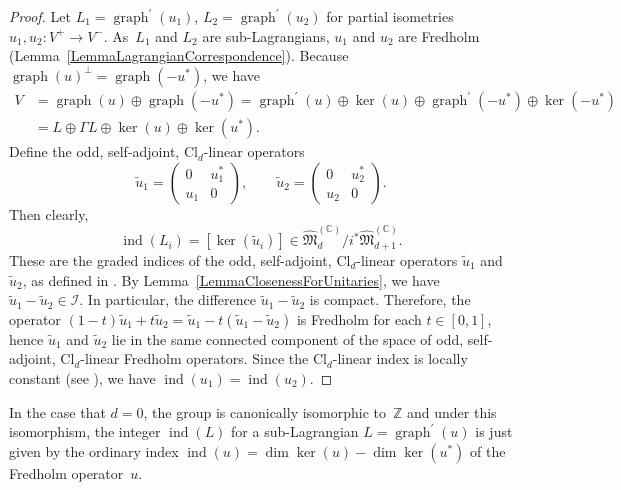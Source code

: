\documentclass[10pt,a4paper]{amsart}
\numberwithin{equation}{section}
\DeclareMathOperator{\graph}{\mathrm{graph}}
\newcommand{\Z}{\mathbb{Z}}
\newcommand{\C}{\mathbb{C}}
\newcommand{\ind}{\operatorname{ind}}
\newcommand{\Cl}{\mathrm{Cl}}
\begin{document}
\begin{proof}
 Let $L_1 = \graph^\prime(u_1)$, $L_2 = \graph^\prime(u_2)$ for partial isometries $u_1, u_2 \colon V^+ \to V^-$.
 As~$L_1$ and $L_2$ are sub-Lagrangians, ${u}_1$ and ${u}_2$ are Fredholm (Lemma~\ref{LemmaLagrangianCorrespondence}).
 Because $\graph(u)^\perp = \graph(-u^*)$, we have
\begin{align*}
V &= \graph (u) \oplus \graph(-u^*) = \graph^\prime(u) \oplus \ker(u) \oplus \graph^\prime(-u^*) \oplus \ker(-u^*)\\
&= L \oplus \Gamma L \oplus \ker(u) \oplus \ker(u^*).
\end{align*}
 Define the odd, self-adjoint, $\Cl_d$-linear operators
 \begin{equation*}
 \tilde{u}_1 = \begin{pmatrix} 0 & u_1^* \\ u_1 & 0 \end{pmatrix}, \qquad \tilde{u}_2 = \begin{pmatrix} 0 & u_2^* \\ u_2 & 0 \end{pmatrix}.
 \end{equation*}
 Then clearly,
 \begin{equation*}
 \ind(L_i) = [\ker(\tilde{u}_i)] \in \hat{\mathfrak{M}}^{(\C)}_d / i^*\hat{\mathfrak{M}}^{(\C)}_{d+1}.
 \end{equation*}
 These are the graded indices of the odd, self-adjoint, $\Cl_d$-linear operators $\tilde{u}_1$ and $\tilde{u}_2$, as defined in \cite[Section~III.10]{LawsonMichelsohn}.
 By Lemma~\ref{LemmaClosenessForUnitaries}, we have $\tilde{u}_1 - \tilde{u}_2 \in \mathcal{I}$.
 In particular, the difference $\tilde{u}_1 - \tilde{u}_2$ is compact.
 Therefore, the operator $(1-t) \tilde{u}_1 + t \tilde{u}_2 = \tilde{u}_1 - t(\tilde{u}_1 - \tilde{u}_2)$ is Fredholm for each $t \in [0, 1]$, hence $\tilde{u}_1$ and $\tilde{u}_2$ lie in the same connected component of the space of odd, self-adjoint, $\Cl_d$-linear Fredholm operators.
 Since the $\Cl_d$-linear index is locally constant (see \cite[Proposition~III.10.6]{LawsonMichelsohn}), we have $\ind(u_1) = \ind(u_2)$.
\end{proof}

\begin{Example}
In the case that $d=0$, the group \smash{$\mathfrak{M}_0^{(\C)} / i^* \mathfrak{M}_1^{(\C)}$} is canonically isomorphic to~$\Z$ and under this isomorphism, the integer $\ind(L)$ for a sub-Lagrangian $L = \graph^\prime(u)$ is just given by the ordinary index $\ind(u) = \dim\ker(u) - \dim\ker(u^*)$ of the Fredholm operator~$u$.
\end{Example}
\end{document}

